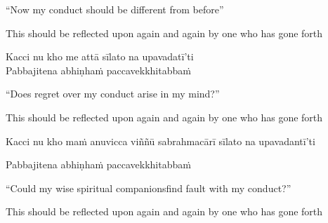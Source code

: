 \ifafive\clearpage\fi

\begin{english-verses}
  ``Now my conduct should be different from before''\ifdigital\makeatletter\hyperlink{endnote101-appendix}\makeatother\fi
  \begin{english-hang-together-verses}
    This should be reflected upon again and again by one who has gone forth
  \end{english-hang-together-verses}
\end{english-verses}

Kacci nu kho me attā sīlato na upavadatī'ti\\
Pabbajitena abhiṇhaṁ paccavekkhitabbaṁ

\begin{english-verses}
  ``Does regret over my conduct arise in my mind?''
  \begin{english-hang-together-verses}
    This should be reflected upon again and again by one who has gone forth
  \end{english-hang-together-verses}
\end{english-verses}

\begin{pali-hang}
  Kacci nu kho maṁ anuvicca viññū sabrahmacārī sīlato na upavadantī'ti
\end{pali-hang}
\begin{pali-hang-together}
  Pabbajitena abhiṇhaṁ paccavekkhitabbaṁ
\end{pali-hang-together}

\begin{english-verses}
  \begin{english-hang-first-line}
  ``Could my wise spiritual companions\ifdigital\makeatletter\hyperlink{endnote165-appendix}\makeatother\fi \thinspace find fault with my conduct?''
  \end{english-hang-first-line}
  \begin{english-hang-together-verses}
    This should be reflected upon again and again by one who has gone forth
  \end{english-hang-together-verses}
\end{english-verses}

